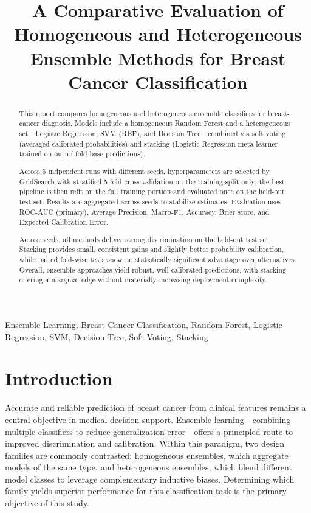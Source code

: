 \documentclass[conference]{IEEEtran}
\begin{document}
\title{A Comparative Evaluation of Homogeneous and Heterogeneous Ensemble Methods for Breast Cancer Classification}

\author{
}


\maketitle

\begin{abstract}
This report compares homogeneous and heterogeneous ensemble classifiers for breast-cancer diagnosis. Models include a homogeneous Random Forest and a heterogeneous set---Logistic Regression, SVM (RBF), and Decision Tree---combined via soft voting (averaged calibrated probabilities) and stacking (Logistic Regression meta-learner trained on out-of-fold base predictions). 

Across 5 indpendent runs with different seeds, hyperparameters are selected by GridSearch with stratified 5-fold cross-validation on the training split only; the best pipeline is then refit on the full training portion and evaluated once on the held-out test set. Results are aggregated across seeds to stabilize estimates. Evaluation uses ROC-AUC (primary), Average Precision, Macro-F1, Accuracy, Brier score, and Expected Calibration Error.
  
Across seeds, all methods deliver strong discrimination on the held-out test set. Stacking provides small, consistent gains and slightly better probability calibration, while paired fold-wise tests show no statistically significant advantage over alternatives. Overall, ensemble approaches yield robust, well-calibrated predictions, with stacking offering a marginal edge without materially increasing deployment complexity.
\end{abstract}
    \smallbreak
\begin{IEEEkeywords}
Ensemble Learning, Breast Cancer Classification, Random Forest, Logistic Regression, SVM, Decision Tree, Soft Voting, Stacking
\end{IEEEkeywords}
\noindent


\section{\textbf{Introduction}}
Accurate and reliable prediction of breast cancer from clinical features remains a central objective in medical decision support. Ensemble learning---combining multiple classifiers to reduce generalization error---offers a principled route to improved discrimination and calibration. Within this paradigm, two design families are commonly contrasted: homogeneous ensembles, which aggregate models of the same type, and heterogeneous ensembles, which blend different model classes to leverage complementary inductive biases. Determining which family yields superior performance for this classification task is the primary objective of this study.
\end{document}
